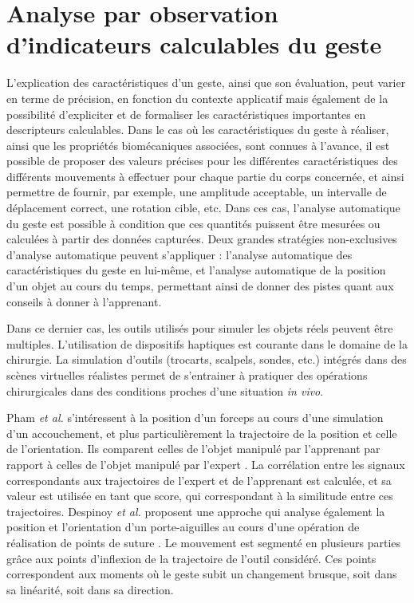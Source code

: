 \section{Analyse par observation d'indicateurs calculables du geste}
L'explication des caractéristiques d'un geste, ainsi que son évaluation, peut varier en terme de précision, en fonction du contexte applicatif mais également de la possibilité d'expliciter et de formaliser les caractéristiques importantes en descripteurs calculables. Dans le cas où les caractéristiques du geste à réaliser, ainsi que les propriétés biomécaniques associées, sont connues à l'avance, il est possible de proposer des valeurs précises pour les différentes caractéristiques des différents mouvements à effectuer pour chaque partie du corps concernée, et ainsi permettre de fournir, par exemple, une amplitude acceptable, un intervalle de déplacement correct, une rotation cible, etc. Dans ces cas, l'analyse automatique du geste est possible à condition que ces quantités puissent être mesurées ou calculées à partir des données capturées. Deux grandes stratégies non-exclusives d'analyse automatique peuvent s'appliquer : l'analyse automatique des caractéristiques du geste en lui-même, et l'analyse automatique de la position d'un objet au cours du temps, permettant ainsi de donner des pistes quant aux conseils à donner à l'apprenant.

Dans ce dernier cas, les outils utilisés pour simuler les objets réels peuvent être multiples. L'utilisation de dispositifs haptiques est courante dans le domaine de la chirurgie. La simulation d'outils (trocarts, scalpels, sondes, etc.) intégrés dans des scènes virtuelles réalistes permet de s'entrainer à pratiquer des opérations chirurgicales dans des conditions proches d'une situation \textit{in vivo}.

Pham \textit{et al.} s'intéressent à la position d'un forceps au cours d'une simulation d'un accouchement, et plus particulièrement la trajectoire de la position et celle de l'orientation. Ils comparent celles de l'objet manipulé par l'apprenant par rapport à celles de l'objet manipulé par l'expert \parencite{Pham2010Tdg}. La corrélation entre les signaux correspondants aux trajectoires de l'expert et de l'apprenant est calculée, et sa valeur est utilisée en tant que score, qui correspondant à la similitude entre ces trajectoires. Despinoy \textit{et al.} proposent une approche qui analyse également la position et l'orientation d'un porte-aiguilles au cours d'une opération de réalisation de points de suture \parencite{Despinoy2016UTS}. Le mouvement est segmenté en plusieurs parties grâce aux points d'inflexion de la trajectoire de l'outil considéré. Ces points correspondent aux moments où le geste subit un changement brusque, soit dans sa linéarité, soit dans sa direction.

